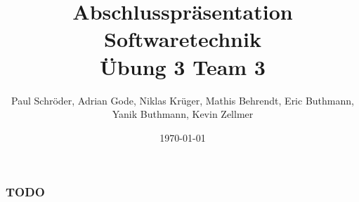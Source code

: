 \documentclass{beamer}
\title{Abschlusspräsentation Softwaretechnik\\ Übung 3 Team 3}
\author{Paul Schröder, Adrian Gode, Niklas Krüger, Mathis Behrendt, Eric Buthmann, Yanik Buthmann, Kevin Zellmer}
\date{\today}
\begin{document}
\frame{\titlepage}

\begin{frame}
	\frametitle{TODO}
\end{frame}
\end{document}
